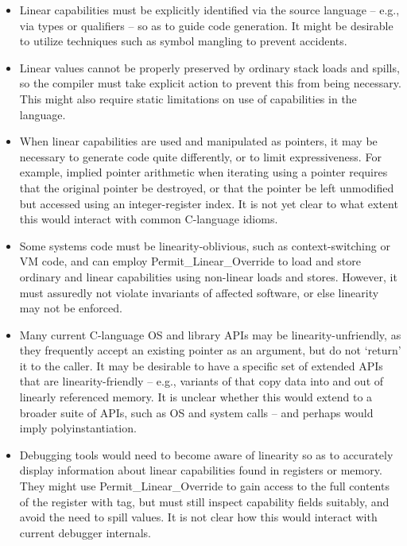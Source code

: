 \begin{itemize}
\item Linear capabilities must be explicitly identified via the source
  language -- e.g., via types or qualifiers -- so as to guide code generation.
  It might be desirable to utilize techniques such as symbol mangling to
  prevent accidents.

\item Linear values cannot be properly preserved by ordinary stack loads and
  spills, so the compiler must take explicit action to prevent this from being
  necessary.
  This might also require static limitations on use of capabilities in the
  language.

\item When linear capabilities are used and manipulated as pointers, it may be
  necessary to generate code quite differently, or to limit expressiveness.
  For example, implied pointer arithmetic when iterating using a pointer
  requires that the original pointer be destroyed, or that the pointer be
  left unmodified but accessed using an integer-register index.
  It is not yet clear to what extent this would interact with common C-language
  idioms.

\item Some systems code must be linearity-oblivious, such as context-switching
  or VM code, and can employ Permit\_Linear\_Override to load and store
  ordinary and linear capabilities using non-linear loads and stores.
  However, it must assuredly not violate invariants of affected software, or
  else linearity may not be enforced.

\item Many current C-language OS and library APIs may be linearity-unfriendly,
  as they frequently accept an existing pointer as an argument, but do not
  `return' it to the caller.
  It may be desirable to have a specific set of extended APIs that are
  linearity-friendly -- e.g., variants of  that copy data into
  and out of linearly referenced memory.
  It is unclear
  whether this would extend to a broader suite of APIs, such as OS 
  and  system calls --  and perhaps would imply polyinstantiation.

\item Debugging tools would need to become aware of linearity so as to
  accurately display information about linear capabilities found in registers
  or memory.
  They might use Permit\_Linear\_Override to gain access to the full contents
  of the register with tag, but must still inspect capability fields suitably,
  and avoid the need to spill values.
  It is not clear how this would interact with current debugger internals.
\end{itemize}

